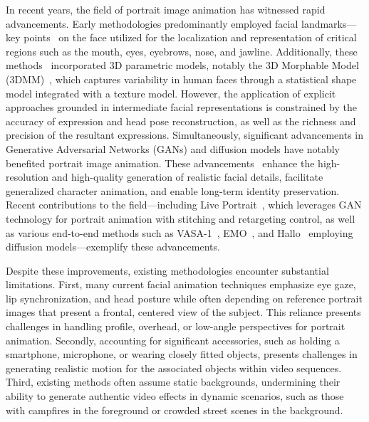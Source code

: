 In recent years, the field of portrait image animation has witnessed rapid advancements. 
Early methodologies predominantly employed facial landmarks—key points~\cite{siarohin2019first,zakharov2020fast,zhang2022sadtalker} on the face utilized for the localization and representation of critical regions such as the mouth, eyes, eyebrows, nose, and jawline. 
Additionally, these methods~\cite{gao2023high,ren2021pirenderer,zhang2023metaportrait,champ2024} incorporated 3D parametric models, notably the 3D Morphable Model (3DMM)~\cite{blanz2003face}, which captures variability in human faces through a statistical shape model integrated with a texture model. 
However, the application of explicit approaches grounded in intermediate facial representations is constrained by the accuracy of expression and head pose reconstruction, as well as the richness and precision of the resultant expressions.
Simultaneously, significant advancements in Generative Adversarial Networks (GANs) and diffusion models have notably benefited portrait image animation. 
These advancements~\cite{corona2024vlogger,liu2024anitalker,tian2024emo,wei2024aniportrait,xu2024vasa,zhang2024tora,champ2024} enhance the high-resolution and high-quality generation of realistic facial details, facilitate generalized character animation, and enable long-term identity preservation. 
Recent contributions to the field—including Live Portrait~\cite{guo2024liveportrait}, which leverages GAN technology for portrait animation with stitching and retargeting control, as well as various end-to-end methods such as VASA-1~\cite{xu2024vasa}, EMO~\cite{tian2024emo}, and Hallo~\cite{xu2024hallo,cui2024hallo2} employing diffusion models—exemplify these advancements.

Despite these improvements, existing methodologies encounter substantial limitations. 
First, many current facial animation techniques emphasize eye gaze, lip synchronization, and head posture while often depending on reference portrait images that present a frontal, centered view of the subject. 
This reliance presents challenges in handling profile, overhead, or low-angle perspectives for portrait animation. Secondly, accounting for significant accessories, such as holding a smartphone, microphone, or wearing closely fitted objects, presents challenges in generating realistic motion for the associated objects within video sequences.
Third, existing methods often assume static backgrounds, undermining their ability to generate authentic video effects in dynamic scenarios, such as those with campfires in the foreground or crowded street scenes in the background.


